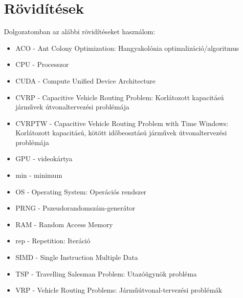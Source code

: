 \section{Rövidítések}
Dolgozatomban az alábbi rövidítéseket használom:
\begin{itemize}
	\item ACO - Ant Colony Optimization: Hangyakolónia optimalizáció/algoritmus
	
	\item CPU - Processzor
	\item CUDA - Compute Unified Device Architecture
	\item CVRP - Capacitive Vehicle Routing Problem: Korlátozott kapacitású járművek útvonaltervezési problémája
	\item CVRPTW - Capacitive Vehicle Routing Problem with Time Windows: Korlátozott kapacitású, kötött időbeosztású járművek útvonaltervezési problémája
	\item GPU - videokártya
	\item min - minimum
	\item OS - Operating System: Operációs rendszer
	\item PRNG - Pszeudorandomszám-generátor
	\item RAM - Random Access Memory
	\item rep - Repetition: Iteráció
	\item SIMD - Single Instruction Multiple Data
	\item TSP - Travelling Salesman Problem: Utazóügynök probléma
	\item VRP - Vehicle Routing Problems: Járműútvonal-tervezési problémák 
\end{itemize}




